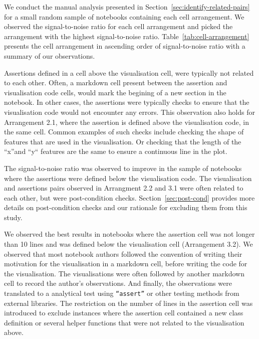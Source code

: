 \documentclass[conference]{IEEEtran}
\begin{document}
We conduct the manual analysis presented in
Section~\ref{sec:identify-related-pairs} for a small random sample of
notebooks containing each cell arrangement. We observed the
signal-to-noise ratio for each cell arrangement and picked the
arrangement with the highest signal-to-noise
ratio. Table~\ref{tab:cell-arrangement} presents the cell arrangement
in ascending order of signal-to-noise ratio with a summary of our
observations.

Assertions defined in a cell above the visualisation cell, were
typically not related to each other. Often, a markdown cell present
between the assertion and visualisation code cells, would mark the
begining of a new section in the notebook. In other cases, the
assertions were typically checks to ensure that the visualisation code
would not encounter any errors. This observation also holds for
Arrangement 2.1, where the assertion is defined above the
visualisation code, in the same cell. Common examples of such checks
include checking the shape of features that are used in the
visualisation. Or checking that the length of the ``x''and ``y``
features are the same to ensure a continuous line in the plot.

The signal-to-noise ratio was observed to improve in the sample of
notebooks where the assertions were defined below the visualisation
code. The visualisation and assertions pairs observed in Arrangment
2.2 and 3.1 were often related to each other, but were post-condition
checks. Section~\ref{sec:post-cond} provides more details on
post-condition checks and our rationale for excluding them from this
study.

We observed the best results in notebooks where the assertion cell was
not longer than 10 lines and was defined below the visualisation cell
(Arrangement 3.2). We observed that most notebook authors followed the
convention of writing their motivation for the visualisation in
a markdown cell, before writing the code for the visualisation. The
visualisations were often followed by another markdown cell to record
the author's observations. And finally, the observations were
translated to a analytical test using \texttt{``assert''} or other
testing methods from external libraries. The restriction on the number
of lines in the assertion cell was introduced to exclude instances
where the assertion cell contained a new class definition or several
helper functions that were not related to the visualisation above.
\end{document}
